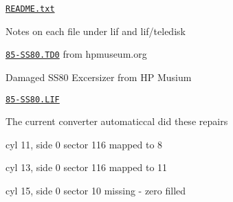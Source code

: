 \begin{DoxyItemize}
\begin{DoxyItemize}
\begin{DoxyItemize}
\begin{DoxyItemize}
\end{DoxyItemize}
\item \href{lif/README.txt}{\tt R\+E\+A\+D\+M\+E.\+txt}
\begin{DoxyItemize}
\item Notes on each file under lif and lif/teledisk
\end{DoxyItemize}
\item \href{lif/85-SS80.TD0}{\tt 85-\/\+S\+S80.\+T\+D0} from hpmuseum.\+org
\begin{DoxyItemize}
\item Damaged S\+S80 Excersizer from HP Musium
\end{DoxyItemize}
\item \href{lif/85-SS80.LIF}{\tt 85-\/\+S\+S80.\+L\+IF}
\begin{DoxyItemize}
\item The current converter automaticcal did these repairs
\begin{DoxyItemize}
\item cyl 11, side 0 sector 116 mapped to 8
\item cyl 13, side 0 sector 116 mapped to 11
\item cyl 15, side 0 sector 10 missing -\/ zero filled
\end{DoxyItemize}
\end{DoxyItemize}
\end{DoxyItemize}
\end{DoxyItemize}
\end{DoxyItemize}

